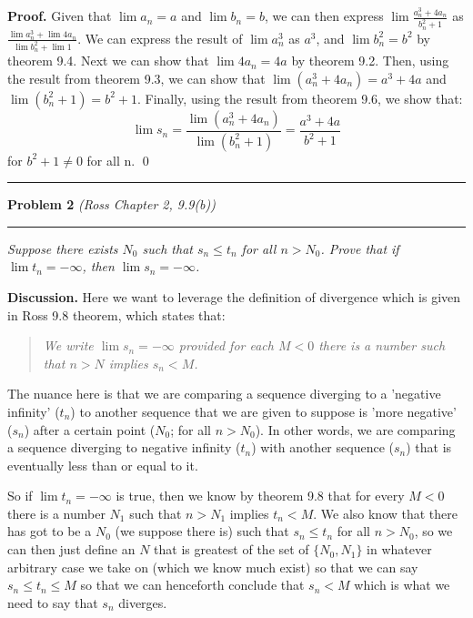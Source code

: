 \documentclass[12pt]{article}
\newcommand{\problem}[2][]{%
  \vspace{0.5em}
  \hrule\vspace{0.4em}
  \textbf{Problem #2}\if\relax\detokenize{#1}\relax\else\; \textit{(#1)}\fi
  \vspace{0.25em}\hrule\vspace{0.8em}
}
\begin{document}
\textbf{Proof.}
Given that $\lim a_n = a$ and $\lim b_n = b$, we can then express $\lim\frac{a_n^3 + 4a_n}{b_n^2 + 1}$ as $\frac{\lim a_n^3 + \lim 4a_n}{\lim b_n^2 + \lim 1}$. We can express the result of $\lim a_n^3$ as $a^3$, and  $\lim b_n^2=b^2$ by theorem 9.4. Next we can show that $\lim 4a_n = 4a$ by theorem 9.2. Then, using the result from theorem 9.3, we can show that $\lim (a_n^3+4a_n) = a^3+4a$ and $\lim (b_n^2+1) = b^2+1$. Finally, using the result from theorem 9.6, we show that:
\[
\lim s_n = \frac{\lim (a_n^3 + 4a_n)}{\lim (b_n^2 + 1)} = \frac{a^3+4a}{b^2+1}
\]
for $b^2+1 \neq 0$ for all n.
\qed

\problem[Ross Chapter 2, 9.9(b)]{2}

\textit{Suppose there exists $N_0$ such that $s_n \leq t_n$ for all $n > N_0$. 
Prove that if $\lim t_n = -\infty$, then $\lim s_n = -\infty$.}

\vspace{0.75em}

\textbf{Discussion.} %
Here we want to leverage the definition of divergence which is given in Ross 9.8 theorem, which states that:

\begin{quote}
    \textit{We write $\lim s_n = -\infty$ provided for each $M < 0$ there is a number such that $ n > N$ implies $s_n < M$.}
\end{quote}

The nuance here is that we are comparing a sequence diverging to a 'negative infinity' ($t_n$) to another sequence that we are given to suppose is 'more negative' ($s_n$) after a certain point ($N_0$;  for all $n > N_0$). In other words, we are comparing a sequence diverging to negative infinity ($t_n$) with another sequence ($s_n$) that is eventually less than or equal to it.

So if $\lim t_n = -\infty$ is true, then we know by theorem 9.8 that for every $M<0$ there is a number $N_1$ such that $n > N_1$ implies $t_n < M$. We also know that there has got to be a $N_0$ (we suppose there is) such that $s_n \leq t_n$ for all $n > N_0$, so we can then just define an $N$ that is greatest of the set of $\{N_0, N_1\}$ in whatever arbitrary case we take on (which we know much exist) so that we can say $s_n \leq t_n \leq M$ so that we can henceforth conclude that $s_n < M$ which is what we need to say that $s_n$ diverges.
\vspace{0.25em}
\end{document}
